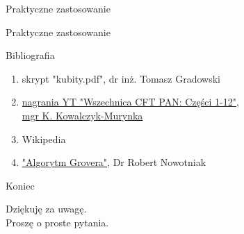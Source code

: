 \documentclass{beamer}
\begin{document}
	\begin{frame}{Praktyczne zastosowanie}
		
	\end{frame}
	
	\begin{frame}{Praktyczne zastosowanie}
		
	\end{frame}
	
	
	
	
	
	\begin{frame}{Bibliografia}
		\begin{block}{}
			\vspace{0.5em}
			\begin{enumerate}
			\item skrypt "kubity.pdf", dr inż. Tomasz Gradowski 
			\item \href{https://www.youtube.com/watch?v=puRu_wEsbAA}{nagrania YT "Wszechnica CFT PAN: Części 1-12",\\ mgr K. Kowalczyk-Murynka}
			\item Wikipedia 
			\item \href{https://robert.nowotniak.com/files/papers/grover.pdf}{"Algorytm Grovera"}, Dr Robert Nowotniak
			\end{enumerate}
			\vspace{0.5em}
		\end{block}	
	\end{frame}

	\begin{frame}{Koniec}
		\begin{block}{}
			\vspace{0.5em}
			\begin{center}
				Dziękuję za uwagę.\\
				Proszę o {\huge proste} pytania.
			\end{center}
			\vspace{0.5em}
		\end{block}
	\end{frame}
	
\end{document}
